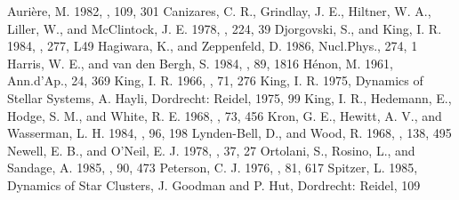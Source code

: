\begin{thebibliography}{}
 Auri\`ere, M.  1982, \aap,
    109, 301
 Canizares, C. R.,
    Grindlay, J. E., Hiltner, W. A., Liller, W., and 
    McClintock, J. E.  1978, \apj, 224, 39
 Djorgovski, S.,
    and King, I. R.  1984, \apjl, 277, L49
 Hagiwara, K., and
    Zeppenfeld, D.  1986, Nucl.Phys., 274, 1
 Harris, W. E.,
    and van den Bergh, S.  1984, \aj, 89, 1816
 H\'enon, M.  1961, Ann.d'Ap., 24, 369
  King, I. R.  1966, \aj, 71, 276
  King, I. R.  1975, Dynamics of
    Stellar Systems, A. Hayli, Dordrecht: Reidel, 1975, 99
  King, I. R., Hedemann, E.,
    Hodge, S. M., and White, R. E.  1968, \aj, 73, 456
 Kron, G. E., Hewitt, A. V.,
    and Wasserman, L. H.  1984, \pasp, 96, 198
 Lynden-Bell, D.,
    and Wood, R.  1968, \mnras, 138, 495
 Newell, E. B.,
    and O'Neil, E. J.  1978, \apjs, 37, 27
 Ortolani, S., Rosino, L.,
    and Sandage, A.  1985, \aj, 90, 473
 Peterson, C. J.  1976, \aj, 81, 617
 Spitzer, L.  1985, Dynamics of
    Star Clusters, J. Goodman and P. Hut, Dordrecht: Reidel, 109
\end{thebibliography}

%
%

